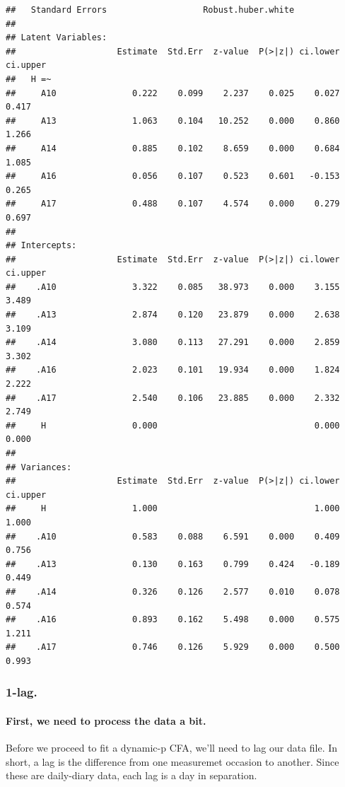 \documentclass[]{article}
\let\oldparagraph\paragraph
\renewcommand{\paragraph}[1]{\oldparagraph{#1}\mbox{}}
\begin{document}
\begin{verbatim}
##   Standard Errors                   Robust.huber.white
## 
## Latent Variables:
##                    Estimate  Std.Err  z-value  P(>|z|) ci.lower ci.upper
##   H =~                                                                  
##     A10               0.222    0.099    2.237    0.025    0.027    0.417
##     A13               1.063    0.104   10.252    0.000    0.860    1.266
##     A14               0.885    0.102    8.659    0.000    0.684    1.085
##     A16               0.056    0.107    0.523    0.601   -0.153    0.265
##     A17               0.488    0.107    4.574    0.000    0.279    0.697
## 
## Intercepts:
##                    Estimate  Std.Err  z-value  P(>|z|) ci.lower ci.upper
##    .A10               3.322    0.085   38.973    0.000    3.155    3.489
##    .A13               2.874    0.120   23.879    0.000    2.638    3.109
##    .A14               3.080    0.113   27.291    0.000    2.859    3.302
##    .A16               2.023    0.101   19.934    0.000    1.824    2.222
##    .A17               2.540    0.106   23.885    0.000    2.332    2.749
##     H                 0.000                               0.000    0.000
## 
## Variances:
##                    Estimate  Std.Err  z-value  P(>|z|) ci.lower ci.upper
##     H                 1.000                               1.000    1.000
##    .A10               0.583    0.088    6.591    0.000    0.409    0.756
##    .A13               0.130    0.163    0.799    0.424   -0.189    0.449
##    .A14               0.326    0.126    2.577    0.010    0.078    0.574
##    .A16               0.893    0.162    5.498    0.000    0.575    1.211
##    .A17               0.746    0.126    5.929    0.000    0.500    0.993
\end{verbatim}

\subsubsection{1-lag.}\label{lag.-1}

\paragraph{First, we need to process the data a
bit.}\label{first-we-need-to-process-the-data-a-bit.}

Before we proceed to fit a dynamic-p CFA, we'll need to lag our data
file. In short, a lag is the difference from one measuremet occasion to
another. Since these are daily-diary data, each lag is a day in
separation.
\end{document}
